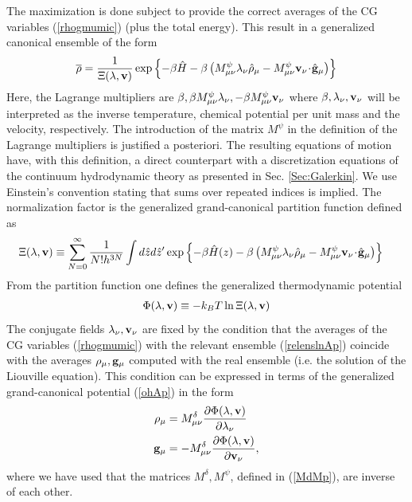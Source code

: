 \documentclass[b5paper,openright,10pt]{book}
\newcommand{\esc}{\!\cdot\!}
\begin{document}
\begin{appendices}
The maximization is done
subject  to  provide   the  correct  averages  of   the  CG  variables
(\ref{rhogmumic})  (plus   the  total   energy).  This  result   in  a
generalized canonical ensemble of the form
\begin{eqnarray}
  \overline{\rho}=\frac{1}{\Xi(\lambda,{\bf v})}\exp\left\{-\beta \hat{H}
-\beta\left(M^\psi_{\mu\nu}\lambda_\nu \hat{\rho}_{\mu}
-M^\psi_{\mu\nu}{\bf v}_\nu\esc\hat{\bf g}_{\mu}\right)\right\}
\label{relenslnAp}
\end{eqnarray}
Here,      the     Lagrange      multipliers     are      $\beta,\beta
M^\psi_{\mu\nu}\lambda_\nu,-\beta  M^\psi_{\mu\nu}{\bf   v}_\nu$  where
$\beta, \lambda_\nu,{\bf  v}_\nu$ will  be interpreted as  the inverse
temperature,  chemical  potential  per  unit mass  and  the  velocity,
respectively.
The introduction of the matrix $M^\psi$ in the definition of the Lagrange multipliers is justified a posteriori. 
The resulting equations of motion have, with this definition, a direct counterpart with a discretization equations of the continuum hydrodynamic theory as presented in Sec. \ref{Sec:Galerkin}.
We use Einstein’s convention stating that sums over repeated indices is implied.
The   normalization   factor   is   the   generalized
grand-canonical partition function defined as
\begin{align}
&\Xi(\lambda,{\bf v})\equiv \sum_{N=0}^\infty \frac{1}{N!h^{3N}}
  \int d\hat{z}d\hat{z}'
  \exp\left\{-\beta \hat{H}(z)-\beta\left( M^\psi_{\mu\nu}\lambda_\nu\hat{\rho}_{\mu}
-M^\psi_{\mu\nu}{\bf v}_\nu\esc\hat{\bf g}_{\mu}\right)\right\}
\label{xiln0}
\end{align}
From the partition function one defines the generalized thermodynamic potential
\begin{eqnarray}
  \Phi (\lambda,{\bf v})\equiv-k_BT \ln\Xi (\lambda,{\bf v})
\label{ohAp}
\end{eqnarray}
The  conjugate  fields  $\lambda_\nu,{\bf  v}_\nu$ are  fixed  by  the
condition that the averages of the CG variables (\ref{rhogmumic}) with
the  relevant ensemble  (\ref{relenslnAp})  coincide  with the  averages
$\rho_\mu,{\bf g}_\mu$ computed with the  real ensemble (i.e. the
solution of the Liouville equation). This condition can be expressed in terms of
the generalized grand-canonical potential (\ref{ohAp})
in the form
\begin{align}
  \rho_\mu &=M^\delta_{\mu\nu}\frac{\partial \Phi(\lambda,{\bf v})}{\partial \lambda_\nu }
\nonumber\\
  {\bf g}_\mu &=-M^\delta_{\mu\nu}\frac{\partial \Phi(\lambda,{\bf v})}{\partial {\bf v}_\nu },
\label{rgoApp}
\end{align}
where we have used that the matrices $M^\delta, M^\psi$, defined in (\ref{MdMp}), are inverse of
each other.  


\end{appendices}
\end{document}
